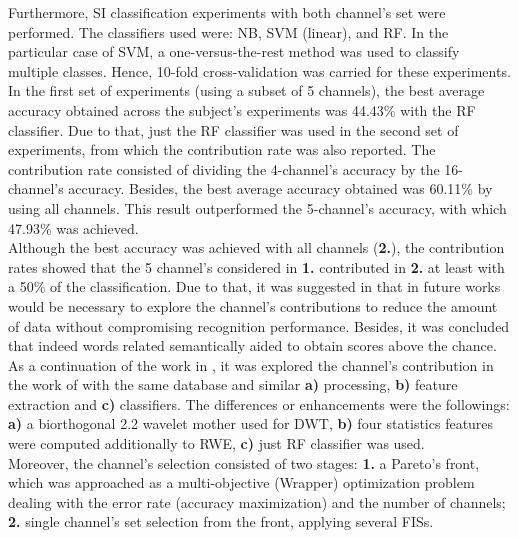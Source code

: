 Furthermore, SI classification experiments with both channel's set were performed. The classifiers used were: NB, SVM (linear), and RF. In the particular case of SVM, a one-versus-the-rest method was used to classify multiple classes. Hence, 10-fold cross-validation was carried for these experiments.\\

In the first set of experiments (using a subset of 5 channels), the best average accuracy obtained across the subject's experiments was 44.43\% with the RF classifier. Due to that, just the RF classifier was used in the second set of experiments, from which the contribution rate was also reported. The contribution rate consisted of dividing the 4-channel's accuracy by the 16-channel's accuracy. Besides, the best average accuracy obtained was 60.11\% by using all channels. This result outperformed the 5-channel's accuracy, with which 47.93\% was achieved.\\

Although the best accuracy was achieved with all channels (\textbf{2.}), the contribution rates showed that the 5 channel's considered in \textbf{1.} contributed in \textbf{2.} at least with a 50\% of the classification. Due to that, it was suggested in \cite{torres2013analisis} that in future works would be necessary to explore the channel's contributions to reduce the amount of data without compromising recognition performance. Besides, it was concluded that indeed words related semantically aided to obtain scores above the chance.\\

As a continuation of the work in \cite{torres2013analisis}, it was explored the channel's contribution in the work of \cite{torres2016implementing} with the same database and similar \textbf{a)} processing, \textbf{b)} feature extraction and \textbf{c)} classifiers. The differences or enhancements were the followings: \textbf{a)} a biorthogonal 2.2 wavelet mother used for DWT, \textbf{b)} four statistics features were computed additionally to RWE, \textbf{c)} just RF classifier was used.\\

Moreover, the channel's selection consisted of two stages: \textbf{1.} a Pareto's front, which was approached as a multi-objective (Wrapper) optimization problem dealing with the error rate (accuracy maximization) and the number of channels; \textbf{2.} single channel's set selection from the front, applying several FISs.\\

